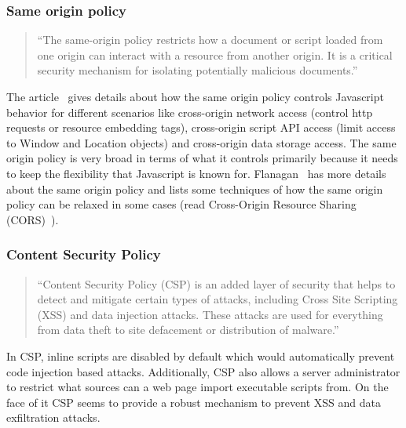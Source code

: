 \subsubsection{Same origin policy}

\begin{quotation}
  ``The same-origin policy restricts how a document or script loaded from one origin
  can interact with a resource from another origin. It is a critical security mechanism
  for isolating potentially malicious documents.''~\cite{sameOrigin}
\end{quotation}
The article~\cite{sameOrigin} gives details about how the same origin policy controls
Javascript behavior for different scenarios like cross-origin network access (control
http requests or resource embedding tags), cross-origin script API access (limit
access to Window and Location objects) and cross-origin data storage access. The
same origin policy is very broad in terms of what it controls primarily because it
needs to keep the flexibility that Javascript is known for. Flanagan~\cite[Section~13.6.2]{flanagan2011javascript}
has more details about the same origin policy and lists some techniques of how the
same origin policy can be relaxed in some cases (read Cross-Origin Resource Sharing
(CORS)~\cite{CORS}).

\subsubsection{Content Security Policy}

\begin{quotation}
``Content Security Policy (CSP) is an added layer of security that helps to detect
and mitigate certain types of attacks, including Cross Site Scripting (XSS) and
data injection attacks. These attacks are used for everything from data theft to
site defacement or distribution of malware.''~\cite{csp}
\end{quotation}
In CSP, inline scripts are disabled by default which would automatically prevent
code injection based attacks. Additionally, CSP also allows a server administrator
to restrict what sources can a web page import executable scripts from. On the face
of it CSP seems to provide a robust mechanism to prevent XSS and data exfiltration
attacks.

